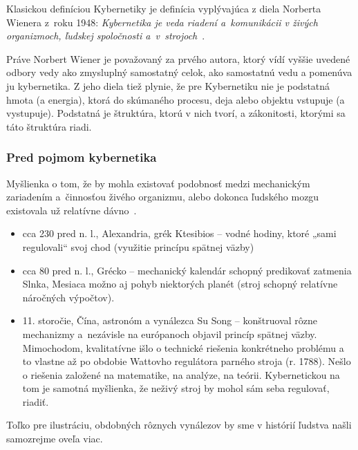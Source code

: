 \documentclass[a4paper, 10pt, ]{article}
\begin{document}
Klasickou definíciou Kybernetiky je definícia vyplývajúca z diela Norberta Wienera z~roku 1948: \emph{Kybernetika je veda riadení a~komunikácii v živých organizmoch, ľudskej spoločnosti a~v~strojoch}~\cite{Wiener2019}.

Práve Norbert Wiener je považovaný za prvého autora, ktorý vídí vyššie uvedené odbory vedy ako zmysluplný samostatný celok, ako samostatnú vedu a pomenúva ju kybernetika. Z jeho diela tiež plynie, že pre Kybernetiku nie je podstatná hmota (a energia), ktorá do skúmaného procesu, deja alebo objektu vstupuje (a vystupuje). Podstatná je štruktúra, ktorú v nich tvorí, a zákonitosti, ktorými sa táto štruktúra riadi.



\subsubsection{Pred pojmom kybernetika}

Myšlienka o tom, že by mohla existovať podobnosť medzi mechanickým zariadením a~činnosťou živého organizmu, alebo dokonca ľudského mozgu existovala už relatívne dávno~\cite{Mares2008}.

\begin{itemize}[leftmargin=0pt, labelsep=3mm, itemsep=0pt]
    \item cca 230 pred n. l., Alexandria, grék Ktesibios -- vodné hodiny, ktoré „sami regulovali“ svoj chod (využitie princípu spätnej väzby)
    \item cca 80 pred n. l., Grécko -- mechanický kalendár schopný predikovať zatmenia Slnka, Mesiaca možno aj pohyb niektorých planét (stroj schopný relatívne náročných výpočtov).
    \item 11. storočie, Čína, astronóm a vynálezca Su Song -- konštruoval rôzne mechanizmy a~nezávisle na európanoch objavil princíp spätnej väzby. \newline Mimochodom, kvalitatívne išlo o technické riešenia konkrétneho problému a to vlastne až po obdobie Wattovho regulátora parného stroja (r. 1788). Nešlo o riešenia založené na matematike, na analýze, na teórii. Kybernetickou na tom je samotná myšlienka, že neživý stroj by mohol sám seba regulovať, riadiť.
\end{itemize}

\noindent
Toľko pre ilustráciu, obdobných rôznych vynálezov by sme v histórií ľudstva našli samozrejme oveľa viac.
\end{document}
